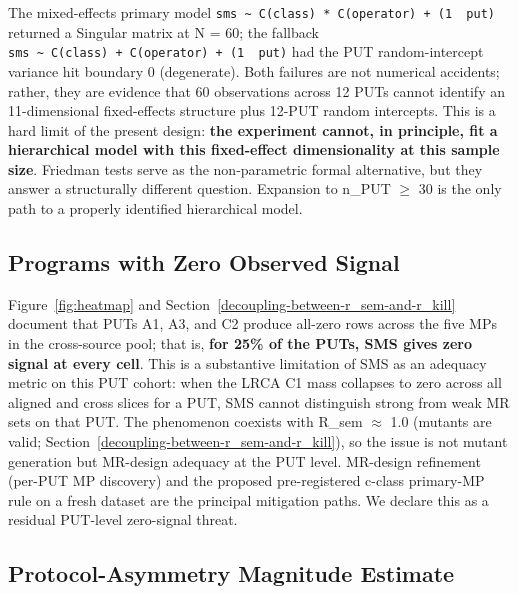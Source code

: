 \documentclass[review,12pt,authoryear]{elsarticle}
\begin{document}
The mixed-effects primary model
\texttt{sms\ \textasciitilde{}\ C(class)\ *\ C(operator)\ +\ (1\ \textbar{}\ put)}
returned a Singular matrix at N = 60; the fallback
\texttt{sms\ \textasciitilde{}\ C(class)\ +\ C(operator)\ +\ (1\ \textbar{}\ put)}
had the PUT random-intercept variance hit boundary 0 (degenerate). Both
failures are not numerical accidents; rather, they are evidence that 60
observations across 12 PUTs cannot identify an 11-dimensional
fixed-effects structure plus 12-PUT random intercepts. This is a hard
limit of the present design: \textbf{the experiment cannot, in
principle, fit a hierarchical model with this fixed-effect
dimensionality at this sample size}. Friedman tests serve as the
non-parametric formal alternative, but they answer a structurally
different question. Expansion to n\_PUT $\geq$ 30 is the only path to a
properly identified hierarchical model.

\subsection{Programs with Zero Observed Signal}\label{put-level-zero-mass-cohort}

Figure~\ref{fig:heatmap} and Section~\ref{decoupling-between-r_sem-and-r_kill} document that PUTs A1, A3, and C2 produce all-zero
rows across the five MPs in the cross-source pool; that is,
\textbf{for 25\% of the PUTs, SMS gives zero signal at every
cell}. This is a substantive limitation of SMS as an adequacy metric on
this PUT cohort: when the LRCA C1 mass collapses to zero across all
aligned and cross slices for a PUT, SMS cannot distinguish strong from
weak MR sets on that PUT. The phenomenon coexists with R\_sem $\approx$ 1.0
(mutants are valid; Section~\ref{decoupling-between-r_sem-and-r_kill}), so the issue is not mutant generation but
MR-design adequacy at the PUT level. MR-design refinement (per-PUT
MP discovery) and the proposed pre-registered c-class primary-MP rule
on a fresh dataset are the principal mitigation paths. We declare this
as a residual PUT-level zero-signal threat.

\subsection{Protocol-Asymmetry Magnitude Estimate}\label{r13-protocol-asymmetry-magnitude-estimate}
\end{document}
